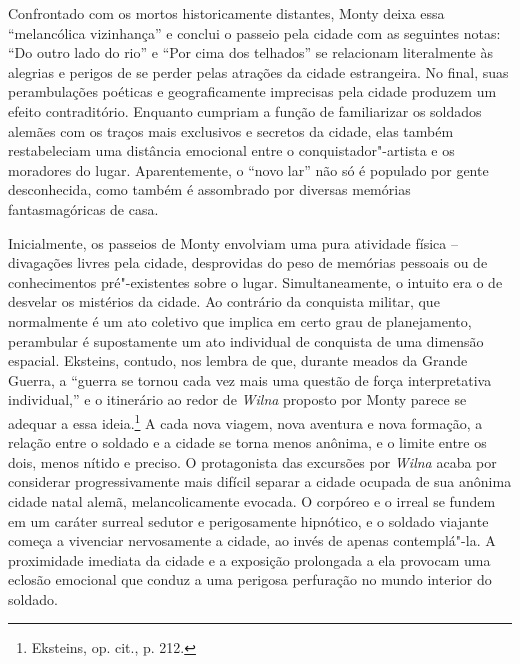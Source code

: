 Confrontado com os mortos historicamente distantes, Monty deixa essa
``melancólica vizinhança'' e conclui o passeio pela cidade com as
seguintes notas: ``Do outro lado do rio'' e ``Por cima dos telhados'' se
relacionam literalmente às alegrias e perigos de se perder pelas
atrações da cidade estrangeira. No final, suas perambulações poéticas e
geograficamente imprecisas pela cidade produzem um efeito contraditório.
Enquanto cumpriam a função de familiarizar os soldados alemães com os
traços mais exclusivos e secretos da cidade, elas também restabeleciam
uma distância emocional entre o conquistador"-artista e os moradores do
lugar. Aparentemente, o ``novo lar'' não só é populado por gente
desconhecida, como também é assombrado por diversas memórias
fantasmagóricas de casa.


Inicialmente, os passeios de Monty envolviam uma pura atividade física --
divagações livres pela cidade, desprovidas do peso de memórias pessoais
ou de conhecimentos pré"-existentes sobre o lugar. Simultaneamente, o
intuito era o de desvelar os mistérios da cidade. Ao contrário da
conquista militar, que normalmente é um ato coletivo que implica em
certo grau de planejamento, perambular é supostamente um ato individual
de conquista de uma dimensão espacial. Eksteins, contudo, nos lembra de
que, durante meados da Grande Guerra, a ``guerra se tornou cada vez mais
uma questão de força interpretativa individual,'' e o itinerário ao
redor de \textit{Wilna} proposto por Monty parece se adequar a essa
ideia.\footnote{Eksteins, op. cit., p. 212.} A cada nova viagem, nova
aventura e nova formação, a relação entre o soldado e a cidade se torna
menos anônima, e o limite entre os dois, menos nítido e preciso. O
protagonista das excursões por \textit{Wilna} acaba por considerar
progressivamente mais difícil separar a cidade ocupada de sua anônima
cidade natal alemã, melancolicamente evocada. O corpóreo e o irreal se
fundem em um caráter surreal sedutor e perigosamente hipnótico, e o
soldado viajante começa a vivenciar nervosamente a cidade, ao invés de
apenas contemplá"-la. A proximidade imediata da cidade e a exposição
prolongada a ela provocam uma eclosão emocional que conduz a uma
perigosa perfuração no mundo interior do soldado.

